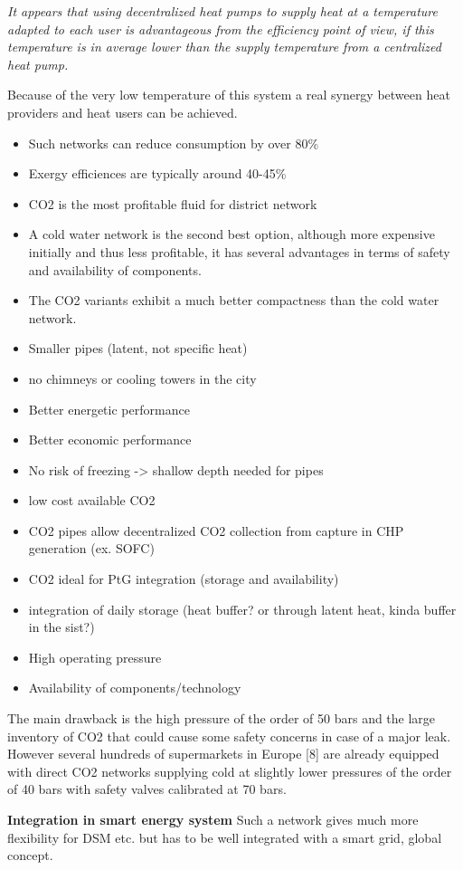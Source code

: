 \documentclass{article}
\newcommand\pro{\item[$+$]}
\newcommand\con{\item[$-$]}
\begin{document}
\textit{It appears that using decentralized heat pumps to
supply heat at a temperature adapted to each user is advantageous from the efficiency point of view, if this temperature is in average lower than the supply temperature from a centralized
heat pump.}\cite{henchozPotentialRefrigerantBased}

Because of the very low temperature of this system a real synergy between heat providers and heat users can be achieved. 


\begin{itemize}
\item Such networks can reduce consumption by over 80\%
\item Exergy efficiences are typically around 40-45\%
\item CO2 is the most profitable fluid for district network
\item A cold water network is the second best option, although more expensive initially
and thus less profitable, it has several advantages in terms of safety and availability of
components.
\item The CO2 variants exhibit a much better compactness than the cold water network.
\end{itemize}
\cite{henchozPotentialRefrigerantBased}

\begin{itemize}
    \pro Smaller pipes (latent, not specific heat)
    \pro no chimneys or cooling towers in the city
    \pro Better energetic performance
    \pro Better economic performance
    \pro No risk of freezing -> shallow depth needed for pipes
    \pro low cost available CO2
    \pro CO2 pipes allow decentralized CO2 collection from capture in CHP generation (ex. SOFC)
    \pro CO2 ideal for PtG integration (storage and availability)
    \pro integration of daily storage (heat buffer? or through latent heat, kinda buffer in the sist?)

    \con High operating pressure
    \con Availability of components/technology
\end{itemize}

The main drawback is the high pressure of the order of 50 bars and the large inventory of CO2 that could cause some safety concerns in case of a major leak. However several hundreds of supermarkets in Europe [8] are already equipped with direct CO2 networks supplying cold at slightly lower pressures of the order of 40 bars with safety valves calibrated at 70 bars.\cite{henchozNovelDistrictHeating2017}

\textbf{Integration in smart energy system}
Such a network gives much more flexibility for DSM etc. but has to be well integrated with a smart grid, global concept.
\end{document}
